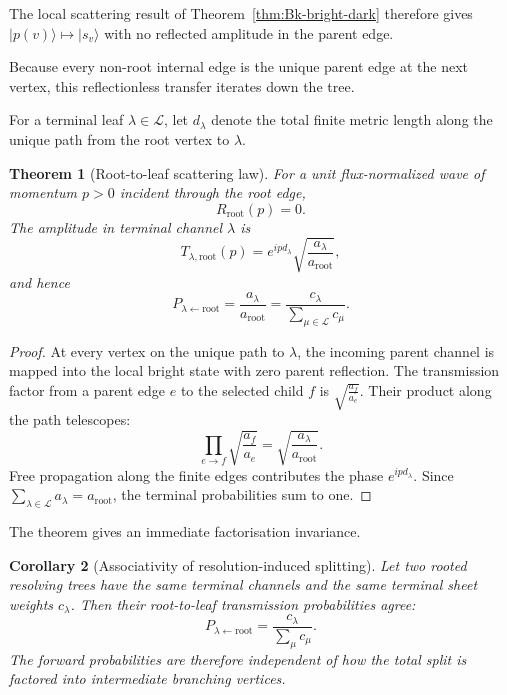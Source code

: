 \documentclass[11pt]{article}
\theoremstyle{plain}
\newtheorem{theorem}{Theorem}[section]
\newtheorem{corollary}[theorem]{Corollary}
\theoremstyle{definition}
\begin{document}
The local scattering result of
Theorem~\ref{thm:Bk-bright-dark} therefore gives \(|p(v)\rangle \longmapsto |s_v\rangle\) with no reflected amplitude in the parent edge.

Because every non-root internal edge is the unique parent edge at the next
vertex, this reflectionless transfer iterates down the tree.

For a terminal leaf
\(\lambda\in\mathcal L\),
let \(d_\lambda\) denote the total finite metric length along the unique path from the root
vertex to \(\lambda\).

\begin{theorem}[Root-to-leaf scattering law]
\label{thm:trees-root-to-leaf}
For a unit flux-normalized wave of momentum \(p>0\) incident through the
root edge,
\[
  R_{\mathrm{root}}(p)=0.
\]
The amplitude in terminal channel \(\lambda\) is
\[
  T_{\lambda,\mathrm{root}}(p)
  =
  e^{ipd_\lambda}
  \sqrt{
    \frac{a_\lambda}{a_{\mathrm{root}}}
  },
\]
and hence
\[
  P_{\lambda\leftarrow\mathrm{root}}
  =
  \frac{a_\lambda}{a_{\mathrm{root}}}
  =
  \frac{c_\lambda}
  {\displaystyle\sum_{\mu\in\mathcal L}c_\mu}.
\]
\end{theorem}

\begin{proof}
At every vertex on the unique path to \(\lambda\), the incoming parent
channel is mapped into the local bright state with zero parent reflection.
The transmission factor from a parent edge \(e\) to the selected child
\(f\) is
\(\sqrt{\frac{a_f}{a_e}}\).
Their product along the path telescopes:
\[
  \prod_{e\to f}
  \sqrt{\frac{a_f}{a_e}}
  =
  \sqrt{
    \frac{a_\lambda}{a_{\mathrm{root}}}
  }.
\]
Free propagation along the finite edges contributes the phase
\(e^{ipd_\lambda}\).
Since
\(\sum_{\lambda\in\mathcal L}a_\lambda = a_{\mathrm{root}}\),
the terminal probabilities sum to one.
\end{proof}

The theorem gives an immediate factorisation invariance.

\begin{corollary}[Associativity of resolution-induced splitting]
\label{cor:trees-associativity}
Let two rooted resolving trees have the same terminal channels and the same
terminal sheet weights \(c_\lambda\). Then their root-to-leaf transmission
probabilities agree:
\[
  P_{\lambda\leftarrow\mathrm{root}}
  =
  \frac{c_\lambda}
  {\sum_\mu c_\mu}.
\]
The forward probabilities are therefore independent of how the total split is
factored into intermediate branching vertices.
\end{corollary}
\end{document}
